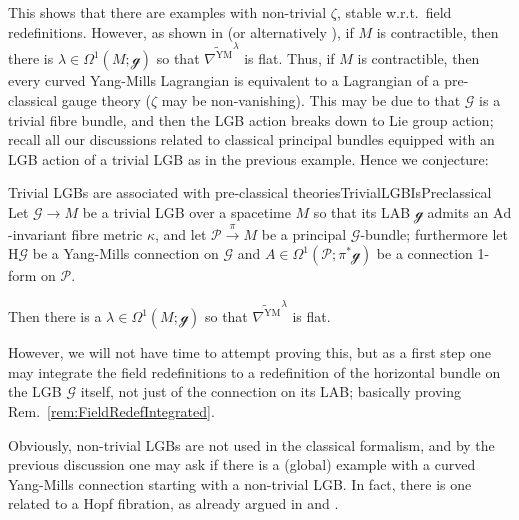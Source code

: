 \documentclass[a4paper,oneside,11pt,bibliography=totoc]{scrartcl}
\theoremstyle{plain}
\theoremstyle{remark}
\theoremstyle{definition}
\begin{document}
This shows that there are examples with non-trivial $\zeta$, stable w.r.t.\ field redefinitions. However, as shown in \cite[\S 5.2, Thm.\ 5.16]{My1stpaper} (or alternatively \cite[\S 5.1.5, Thm.\ 5.1.33]{MyThesis}), if $M$ is contractible, then there is $\lambda \in \Omega^1(M; \mathcal{g})$ so that $\widetilde{\nabla^{\mathrm{YM}}}^\lambda$ is flat. Thus, if $M$ is contractible, then every curved Yang-Mills Lagrangian is equivalent to a Lagrangian of a pre-classical gauge theory ($\zeta$ may be non-vanishing). This may be due to that $\mathcal{G}$ is a trivial fibre bundle, and then the LGB action breaks down to Lie group action; recall all our discussions related to classical principal bundles equipped with an LGB action of a trivial LGB as in the previous example. 
Hence we conjecture:

\begin{conjectures}{Trivial LGBs are associated with pre-classical theories}{TrivialLGBIsPreclassical}
Let $\mathcal{G} \to M$ be a trivial LGB over a spacetime $M$ so that its LAB $\mathcal{g}$ admits an $\mathrm{Ad}$-invariant fibre metric $\kappa$, and let $\mathcal{P} \stackrel{\pi}{\to} M$ be a principal $\mathcal{G}$-bundle; furthermore let $\mathrm{H}\mathcal{G}$ be a Yang-Mills connection on $\mathcal{G}$ and $A \in \Omega^1(\mathcal{P}; \pi^*\mathcal{g})$ be a connection 1-form on $\mathcal{P}$.

Then there is a $\lambda \in \Omega^1(M; \mathcal{g})$ so that $\widetilde{\nabla^{\mathrm{YM}}}^\lambda$ is flat.
\end{conjectures}

However, we will not have time to attempt proving this, but as a first step one may integrate the field redefinitions to a redefinition of the horizontal bundle on the LGB $\mathcal{G}$ itself, not just of the connection on its LAB; basically proving Rem.\ \ref{rem:FieldRedefIntegrated}.

Obviously, non-trivial LGBs are not used in the classical formalism, and by the previous discussion one may ask if there is a (global) example with a curved Yang-Mills connection starting with a non-trivial LGB. In fact, there is one related to a Hopf fibration, as already argued in \cite[\S 5.3, Ex.\ 5.18]{My1stpaper} and \cite[\S 5.1.5, Ex.\ 5.1.35]{MyThesis}.
\end{document}

